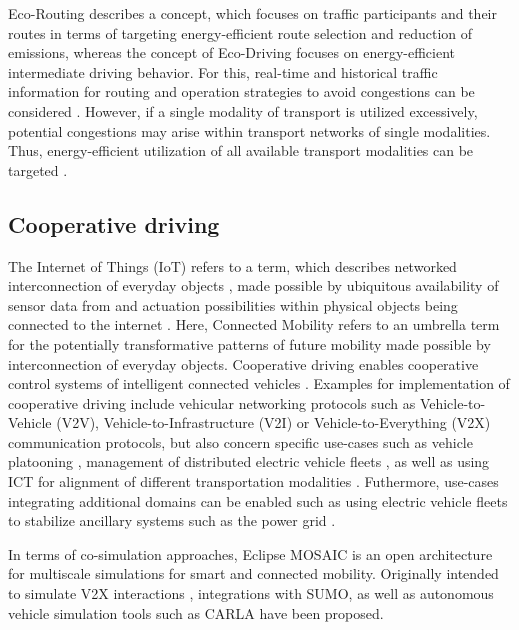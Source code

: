 \documentclass[a4paper,twoside]{article}
\begin{document}
Eco-Routing \cite{ericsson2006optimizing} describes a concept, which focuses on traffic participants and their routes in terms of targeting energy-efficient route selection and reduction of emissions, whereas the concept of Eco-Driving \cite{huang2018eco} focuses on energy-efficient intermediate driving behavior. For this, real-time and historical traffic information for routing and operation strategies to avoid congestions can be considered \cite{Boriboonsomsin2012}. However, if a single modality of transport is utilized excessively, potential congestions may arise within transport networks of single modalities. Thus, energy-efficient utilization of all available transport modalities can be targeted \cite{namoun2021eco}.

	\subsection{Cooperative driving}
\label{sec:cooperative-driving}

	
	 The Internet of Things (IoT) refers to a term, which describes networked interconnection of everyday objects \cite{xia2012internet}, made possible by ubiquitous availability of sensor data from and actuation possibilities within physical objects being connected to the internet \cite{kopetz2011internet}. Here, Connected Mobility refers to an umbrella term for the potentially transformative patterns \cite{olia2016assessing} of future mobility made possible by interconnection of everyday objects. Cooperative driving enables cooperative control systems of intelligent connected vehicles \cite{wang2022review}. Examples for implementation of cooperative driving include vehicular networking protocols such as Vehicle-to-Vehicle (V2V), Vehicle-to-Infrastructure (V2I) or Vehicle-to-Everything (V2X) communication protocols, but also concern specific use-cases such as vehicle platooning \cite{jia2015survey}, management of distributed electric vehicle fleets \cite{hu2016electric}, as well as using ICT for alignment of different transportation modalities \cite{harris2015ict}. Futhermore, use-cases integrating additional domains can be enabled such as using electric vehicle fleets to stabilize ancillary systems such as the power grid \cite{tomic2007using}.
	
	 In terms of co-simulation approaches, Eclipse MOSAIC \cite{noauthor_eclipse_nodate} is an open architecture for multiscale simulations for smart and connected mobility. Originally intended to simulate V2X interactions \cite{schunemann_v2x_2011}, integrations with SUMO, as well as autonomous vehicle simulation tools such as CARLA \cite{dosovitskiy_carla_2017} have been proposed. 
	
\end{document}
